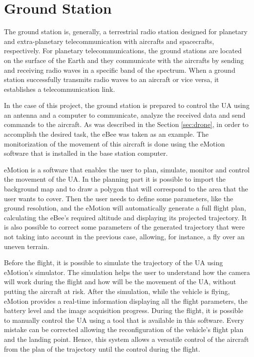 \section{Ground Station}\label{sec:gs}

The ground station is, generally, a terrestrial radio station designed for planetary and extra-planetary telecommunication with aircrafts and spacecrafts, respectively. For planetary telecommunications, the ground stations are located on the surface of the Earth and they communicate with the aircrafts by sending and receiving radio waves in a specific band of the spectrum. When a ground station successfully transmits radio waves to an aircraft or vice versa, it establishes a telecommunication link.

In the case of this project, the ground station is prepared to control the UA using an antenna and a computer to communicate, analyze the received data and send commands to the aircraft. As was described in the Section \ref{sec:drone}, in order to accomplish the desired task, the eBee was taken as an example. The monitorization of the movement of this aircraft is done using the eMotion software that is installed in the base station computer.

eMotion is a software that enables the user to plan, simulate, monitor and control the movement of the UA. In the planning part it is possible to import the background map and to draw a polygon that will correspond to the area that the user wants to cover. Then the user needs to define some parameters, like the ground resolution, and the eMotion will automatically generate a full flight plan, calculating the eBee’s required altitude and displaying its projected trajectory. It is also possible to correct some parameters of the generated trajectory that were not taking into account in the previous case, allowing, for instance, a fly over an uneven terrain.

Before the flight, it is possible to simulate the trajectory of the UA using eMotion's simulator. The simulation helps the user to understand how the camera will work during the flight and how will be the movement of the UA, without putting the aircraft at risk. After the simulation, while the vehicle is flying, eMotion provides a real-time information displaying all the flight parameters, the battery level and the image acquisition progress. During the flight, it is possible to manually control the UA using a tool that is available in this software. Every mistake can be corrected allowing the reconfiguration of the vehicle's flight plan and the landing point. Hence, this system allows a versatile control of the aircraft from the plan of the trajectory until the control during the flight.